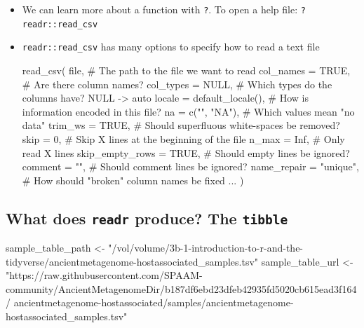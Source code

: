 \documentclass[
  letterpaper,
]{book}
\newenvironment{Shaded}{}{}
\newcommand{\AttributeTok}[1]{\textcolor[rgb]{0.84,0.23,0.29}{#1}}
\newcommand{\CommentTok}[1]{\textcolor[rgb]{0.42,0.45,0.49}{#1}}
\newcommand{\ConstantTok}[1]{\textcolor[rgb]{0.00,0.36,0.77}{#1}}
\newcommand{\DecValTok}[1]{\textcolor[rgb]{0.00,0.36,0.77}{#1}}
\newcommand{\FunctionTok}[1]{\textcolor[rgb]{0.44,0.26,0.76}{#1}}
\newcommand{\NormalTok}[1]{\textcolor[rgb]{0.14,0.16,0.18}{#1}}
\newcommand{\OtherTok}[1]{\textcolor[rgb]{0.44,0.26,0.76}{#1}}
\newcommand{\StringTok}[1]{\textcolor[rgb]{0.01,0.18,0.38}{#1}}
\begin{document}
\begin{itemize}
\item
  We can learn more about a function with \texttt{?}. To open a help
  file: \texttt{?readr::read\_csv}
\item
  \texttt{readr::read\_csv} has many options to specify how to read a
  text file

\begin{Shaded}
\begin{Highlighting}[]
\FunctionTok{read\_csv}\NormalTok{(}
\NormalTok{file,                      }\CommentTok{\# The path to the file we want to read}
\AttributeTok{col\_names =} \ConstantTok{TRUE}\NormalTok{,          }\CommentTok{\# Are there column names?}
\AttributeTok{col\_types =} \ConstantTok{NULL}\NormalTok{,          }\CommentTok{\# Which types do the columns have? NULL {-}\textgreater{} auto}
\AttributeTok{locale =} \FunctionTok{default\_locale}\NormalTok{(), }\CommentTok{\# How is information encoded in this file?}
\AttributeTok{na =} \FunctionTok{c}\NormalTok{(}\StringTok{""}\NormalTok{, }\StringTok{"NA"}\NormalTok{),          }\CommentTok{\# Which values mean "no data"}
\AttributeTok{trim\_ws =} \ConstantTok{TRUE}\NormalTok{,            }\CommentTok{\# Should superfluous white{-}spaces be removed?}
\AttributeTok{skip =} \DecValTok{0}\NormalTok{,                  }\CommentTok{\# Skip X lines at the beginning of the file}
\AttributeTok{n\_max =} \ConstantTok{Inf}\NormalTok{,               }\CommentTok{\# Only read X lines}
\AttributeTok{skip\_empty\_rows =} \ConstantTok{TRUE}\NormalTok{,    }\CommentTok{\# Should empty lines be ignored?}
\AttributeTok{comment =} \StringTok{""}\NormalTok{,              }\CommentTok{\# Should comment lines be ignored?}
\AttributeTok{name\_repair =} \StringTok{"unique"}\NormalTok{,    }\CommentTok{\# How should "broken" column names be fixed}
\NormalTok{...}
\NormalTok{)}
\end{Highlighting}
\end{Shaded}
\end{itemize}

\hypertarget{what-does-readr-produce-the-tibble}{%
\subsection{\texorpdfstring{What does \texttt{readr} produce? The
\texttt{tibble}}{What does readr produce? The tibble}}\label{what-does-readr-produce-the-tibble}}

\begin{Shaded}
\begin{Highlighting}[]
\NormalTok{sample\_table\_path }\OtherTok{\textless{}{-}} \StringTok{"/vol/volume/3b{-}1{-}introduction{-}to{-}r{-}and{-}the{-}tidyverse/ancientmetagenome{-}hostassociated\_samples.tsv"}
\NormalTok{sample\_table\_url }\OtherTok{\textless{}{-}}
\StringTok{"https://raw.githubusercontent.com/SPAAM{-}community/AncientMetagenomeDir/b187df6ebd23dfeb42935fd5020cb615ead3f164/}
\StringTok{ancientmetagenome{-}hostassociated/samples/ancientmetagenome{-}hostassociated\_samples.tsv"}
\end{Highlighting}
\end{Shaded}
\end{document}
